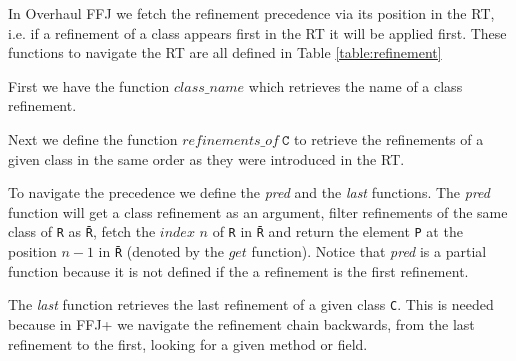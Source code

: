 In Overhaul \ac{FFJ} we fetch the refinement precedence via its position in the \textsf{RT}, i.e.
if a refinement of a class appears first in the \textsf{RT} it will be applied first. 
These functions to navigate the \textsf{RT} are all defined in Table \ref{table:refinement}
    
First we have the function $class\_name$ which retrieves the name of a class refinement.

Next we define the function $refinements\_of~\texttt{C}$ to retrieve the refinements of 
a given class in the same order as they were introduced in the \textsf{RT}.

To navigate the precedence we define the \textit{pred} and the \textit{last} functions.
The \textit{pred} function will get a class refinement as an argument,
filter refinements of the same class of \texttt{R} as \texttt{\=R}, fetch the $index$ $n$ of \texttt{R} in \texttt{\=R} 
and return the element \texttt{P} at the position $n-1$ in \texttt{\=R} (denoted by the $get$ function). Notice that \textit{pred} is a partial function
because it is not defined if the a refinement is the first refinement.

The \textit{last} function retrieves the last refinement of a given class \texttt{C}.
This is needed because in \ac{FFJ+} we navigate the refinement chain backwards, from the last refinement
to the first, looking for a given method or field. 

